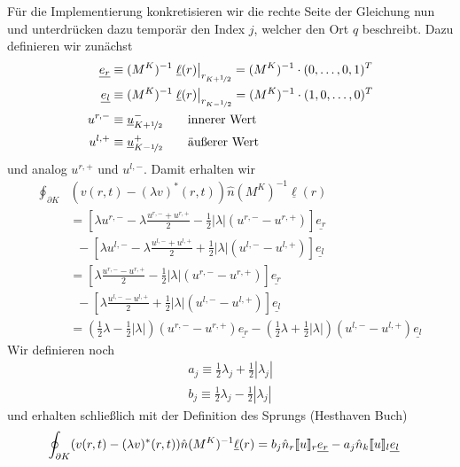 Für die Implementierung konkretisieren wir die rechte Seite der Gleichung nun und unterdrücken dazu temporär den Index $j$, welcher den Ort $q$ beschreibt. Dazu definieren wir zunächst
\begin{align}
  \underline{e_r} &\equiv (M^K)^{-1}\left.\underline{\ell}(r) \right|_{r_{K+\nicefrac{1}{2}}} = (M^K)^{-1}  \cdot (0,\dots,0,1)^T \\
  \underline{e_l} &\equiv (M^K)^{-1}\left.\underline{\ell}(r) \right|_{r_{K-\nicefrac{1}{2}}} = (M^K)^{-1}  \cdot (1,0,\dots,0)^T \\
  u^{r, -} &\equiv \underline{u}_{K+\nicefrac{1}{2}}^- \qquad \text{innerer Wert} \\
  u^{l, +} &\equiv \underline{u}_{K-\nicefrac{1}{2}}^+ \qquad \text{äußerer Wert} \\
\end{align}
und analog $u^{r, +}$ und $u^{l, -}$. Damit erhalten wir
\begin{align*}
  \oint_{\partial K}  &(v(r,t) - (\lambda v)^*(r,t)) \hat{n}  (M^K)^{-1}\underline{\ell}(r) \\
  & = \left[  \lambda u^{r, -} - \lambda\frac{u^{r, -} + u^{r, +}}{2} - \frac{1}{2}|\lambda|(u^{r, -} - u^{r, +})   \right] \underline{e_r} \\
  &\;\;- \left[  \lambda u^{l, -} - \lambda\frac{u^{l, -} + u^{l, +}}{2} + \frac{1}{2}|\lambda|(u^{l, -} - u^{l, +})   \right] \underline{e_l} \\
  & =    \left[   \lambda\frac{u^{r,-} - u^{r,+}}{2} - \frac{1}{2}|\lambda|(u^{r, -} - u^{r, +}) \right] \underline{e_r} \\
  &\;\;- \left[   \lambda\frac{u^{l,-} - u^{l,+}}{2} + \frac{1}{2}|\lambda|(u^{l, -} - u^{l, +}) \right] \underline{e_l} \\
  & = \left( \frac{1}{2}\lambda - \frac{1}{2}|\lambda| \right) (u^{r,-} - u^{r, +})\underline{e_r} - \left( \frac{1}{2}\lambda + \frac{1}{2}|\lambda| \right) (u^{l,-} - u^{l, +})\underline{e_l}
\end{align*}
Wir definieren noch
\begin{align}
  a_j \equiv \frac{1}{2}\lambda_j + \frac{1}{2}|\lambda_j| \\
  b_j \equiv \frac{1}{2}\lambda_j - \frac{1}{2}|\lambda_j|
\end{align}
und erhalten schließlich mit der Definition des Sprungs (Hesthaven Buch)
\begin{align}
  \oint_{\partial K}  &(v(r,t) - (\lambda v)^*(r,t)) \hat{n}  (M^K)^{-1}\underline{\ell}(r) = b_j \hat{n}_r\llbracket u \rrbracket_r\underline{e_r} - a_j\hat{n}_k\llbracket u \rrbracket_l\underline{e_l}
\end{align}


